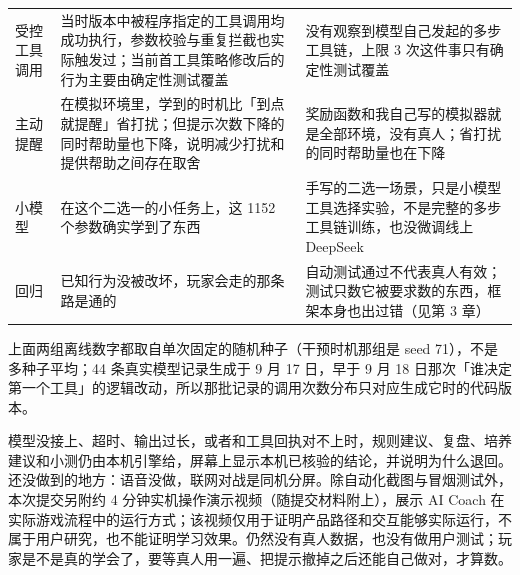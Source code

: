 {\begin{minipage}{\linewidth}
\begin{tabular}{>{\raggedright\arraybackslash}m{1.6cm} L{6.5cm} L{6.5cm}}
\addlinespace[6pt]
受控工具调用 & 当时版本中被程序指定的工具调用均成功执行，参数校验与重复拦截也实际触发过；当前首工具策略修改后的行为主要由确定性测试覆盖 & 没有观察到模型自己发起的多步工具链，上限 3 次这件事只有确定性测试覆盖 \\
\addlinespace[6pt]
主动提醒 & 在模拟环境里，学到的时机比「到点就提醒」省打扰；但提示次数下降的同时帮助量也下降，说明减少打扰和提供帮助之间存在取舍 & 奖励函数和我自己写的模拟器就是全部环境，没有真人；省打扰的同时帮助量也在下降 \\
\addlinespace[6pt]
小模型 & 在这个二选一的小任务上，这 1152 个参数确实学到了东西 & 手写的二选一场景，只是小模型工具选择实验，不是完整的多步工具链训练，也没微调线上 DeepSeek \\
\addlinespace[6pt]
回归 & 已知行为没被改坏，玩家会走的那条路是通的 & 自动测试通过不代表真人有效；测试只数它被要求数的东西，框架本身也出过错（见第 3 章） \\
\bottomrule
\end{tabular}
\par
\end{minipage}
\par
}

上面两组离线数字都取自单次固定的随机种子（干预时机那组是 seed 71），不是多种子平均；44 条真实模型记录生成于 9 月 17 日，早于 9 月 18 日那次「谁决定第一个工具」的逻辑改动，所以那批记录的调用次数分布只对应生成它时的代码版本。

模型没接上、超时、输出过长，或者和工具回执对不上时，规则建议、复盘、培养建议和小测仍由本机引擎给，屏幕上显示本机已核验的结论，并说明为什么退回。还没做到的地方：语音没做，联网对战是同机分屏。除自动化截图与冒烟测试外，本次提交另附约 4 分钟实机操作演示视频（随提交材料附上），展示 AI Coach 在实际游戏流程中的运行方式；该视频仅用于证明产品路径和交互能够实际运行，不属于用户研究，也不能证明学习效果。仍然没有真人数据，也没有做用户测试；玩家是不是真的学会了，要等真人用一遍、把提示撤掉之后还能自己做对，才算数。
